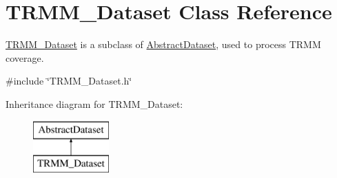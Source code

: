 \hypertarget{classTRMM__Dataset}{
\section{TRMM\_\-Dataset Class Reference}
\label{classTRMM__Dataset}
}


\hyperlink{classTRMM__Dataset}{TRMM\_\-Dataset} is a subclass of \hyperlink{classAbstractDataset}{AbstractDataset}, used to process TRMM coverage.  




{\ttfamily \#include \char`\"{}TRMM\_\-Dataset.h\char`\"{}}

Inheritance diagram for TRMM\_\-Dataset:\begin{figure}[H]
\begin{center}
\leavevmode
\includegraphics[height=2.000000cm]{classTRMM__Dataset}
\end{center}
\end{figure}
